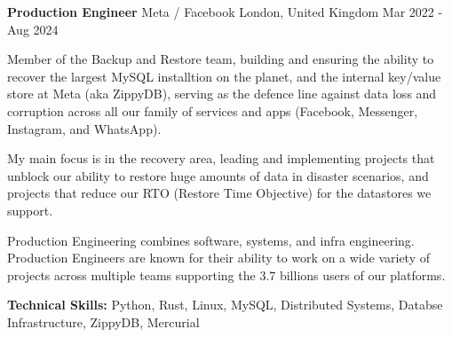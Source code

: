 

\begin{cventries}

	\cventry
	{\textbf{Production Engineer}} %
	{Meta / Facebook} %
	{London, United Kingdom} %
	{Mar 2022 - Aug 2024} %
	{
		\begin{cvitems} %
			\item {Member of the Backup and Restore team, building and ensuring the ability to recover the largest MySQL
			            installtion on the planet, and the internal key/value store at Meta (aka ZippyDB), serving as the defence line
			            against data loss and corruption across all our family of services and apps (Facebook, Messenger, Instagram, and
			            WhatsApp).}
			\item {My main focus is in the recovery area, leading and implementing projects that unblock our ability to
			            restore huge amounts of data in disaster scenarios, and projects that reduce our RTO (Restore Time Objective)
			            for the datastores we support.}
			\item {Production Engineering combines software, systems, and infra engineering. Production Engineers are known
			            for their ability to work on a wide variety of projects across multiple teams supporting the 3.7 billions users
			            of our platforms.}
			\item {\textbf{Technical Skills:} Python, Rust, Linux, MySQL, Distributed Systems, Databse Infrastructure, ZippyDB, Mercurial}
		\end{cvitems}
	}


\end{cventries}
